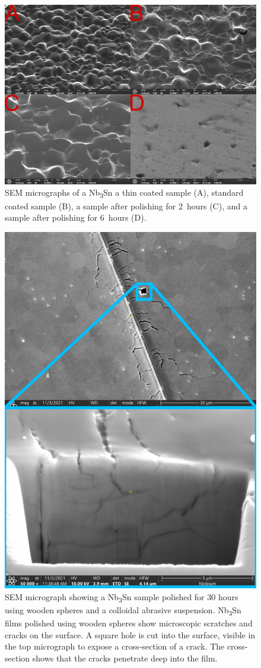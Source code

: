 \begin{figure}[t]%
\centering%
\includegraphics[width=0.8\columnwidth]{../doc/figs/SEM_Images.png}%
\caption{SEM micrographs of a Nb\textsubscript{3}Sn a thin coated sample (A), standard coated sample (B), a sample after polishing for 2~hours (C), and a sample after polishing for 6~hours (D).}%
\label{fig:semimages}%
\end{figure}

%


\begin{figure}[t]%
\centering%
\includegraphics[width=0.8\columnwidth]{../doc/figs/Sample_Surface_Scratches.png}%
\caption{SEM micrograph showing a Nb\textsubscript{3}Sn sample polished for 30 hours using wooden spheres and a colloidal abrasive suspension. Nb\textsubscript{3}Sn films polished using wooden spheres show microscopic scratches and cracks on the surface. A square hole is cut into the surface, visible in the top micrograph to expose a cross-section of a crack. The cross-section shows that the cracks penetrate deep into the film.}%
\label{fig:samplesurfacescratches}%
\end{figure}


